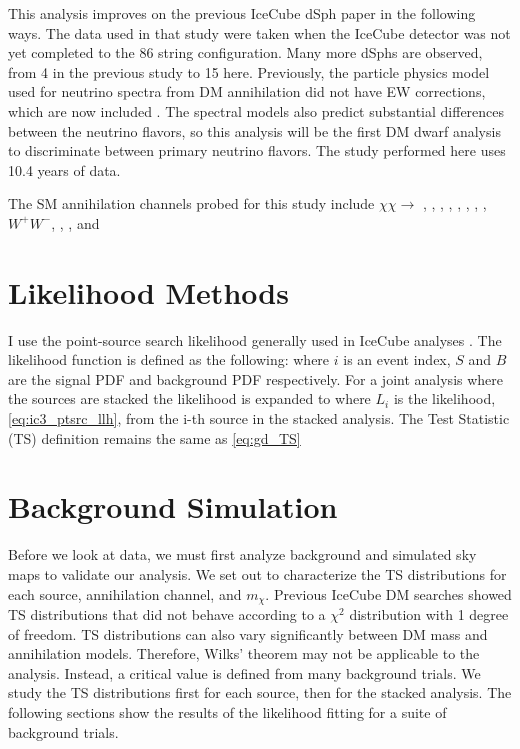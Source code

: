 This analysis improves on the previous IceCube dSph paper \cite{IC3_DM2013} in the following ways.
The data used in that study were taken when the IceCube detector was not yet completed to the 86 string configuration.
Many more dSphs are observed, from 4 in the previous study to 15 here.
Previously, the particle physics model used for neutrino spectra from DM annihilation did not have EW corrections, which are now included \cite{Rodd:HDM_spec}.
The spectral models also predict substantial differences between the neutrino flavors, so this analysis will be the first DM dwarf analysis to discriminate between primary neutrino flavors.
The study performed here uses 10.4 years of data.

The SM annihilation channels probed for this study include $\chi\chi \rightarrow$
, , , , , \parpar{\mu}, \parpar{\tau}, , $W^+W^-$, , \parpar{\nu_\mu}, and \parpar{\nu_\tau}

\section{Likelihood Methods}\label{sec:icDM_LLH}

I use the point-source search likelihood generally used in IceCube analyses \cite{IC_NGC1068}.
The likelihood function is defined as the following:
\icPtSrcLLH
where  $ i $ is an event index, $S$ and $B$ are the signal PDF and background PDF respectively. For a joint analysis where the sources are stacked the likelihood is expanded to
\icStackLLH
where $ L_i $ is the likelihood, \cref{eq:ic3_ptsrc_llh}, from the i-th source in the stacked analysis.
The Test Statistic (TS) definition remains the same as \cref{eq:gd_TS}

\section{Background Simulation}\label{sec:icDM_bkgd_sim}

Before we look at data, we must first analyze background and simulated sky maps to validate our analysis.
We set out to characterize the TS distributions for each source, annihilation channel, and $m_\chi$.
Previous IceCube DM searches \cite{Minjin_icrc23,IC3_nulines} showed TS distributions that did not behave according to a $\chi^2$ distribution with 1 degree of freedom.
TS distributions can also vary significantly between DM mass and annihilation models.
Therefore, Wilks' theorem may not be applicable to the analysis.
Instead, a critical value is defined from many background trials.
We study the TS distributions first for each source, then for the stacked analysis.
The following sections show the results of the likelihood fitting for a suite of background trials.

